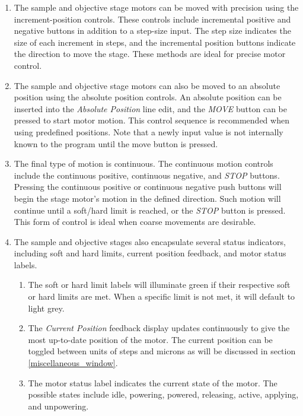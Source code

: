 \documentclass[a4paper, 12pt]{report}
\begin{document}
    \begin{enumerate}
        \item The sample and objective stage motors can be moved with precision using the increment-position controls. These controls include incremental positive and negative buttons in addition to a step-size input. The step size indicates the size of each increment in steps, and the incremental position buttons indicate the direction to move the stage. These methods are ideal for precise motor control.
        \item The sample and objective stage motors can also be moved to an absolute position using the absolute position controls. An absolute position can be inserted into the \textit{Absolute Position} line edit, and the \textit{MOVE} button can be pressed to start motor motion. This control sequence is recommended when using predefined positions. Note that a newly input value is not internally known to the program until the move button is pressed.
        \item The final type of motion is continuous. The continuous motion controls include the continuous positive, continuous negative, and \textit{STOP} buttons. Pressing the continuous positive or continuous negative push buttons will begin the stage motor's motion in the defined direction. Such motion will continue until a soft/hard limit is reached, or the \textit{STOP} button is pressed. This form of control is ideal when coarse movements are desirable.
        \item The sample and objective stages also encapsulate several status indicators, including soft and hard limits, current position feedback, and motor status labels.
        \begin{enumerate}
            \item The soft or hard limit labels will illuminate green if their respective soft or hard limits are met. When a specific limit is not met, it will default to light grey.
            \item The \textit{Current Position} feedback display updates continuously to give the most up-to-date position of the motor. The current position can be toggled between units of steps and microns as will be discussed in section \ref{miscellaneous_window}.
            \item The motor status label indicates the current state of the motor. The possible states include idle, powering, powered, releasing, active, applying, and unpowering.
        \end{enumerate}
    \end{enumerate}
    
\end{document}
